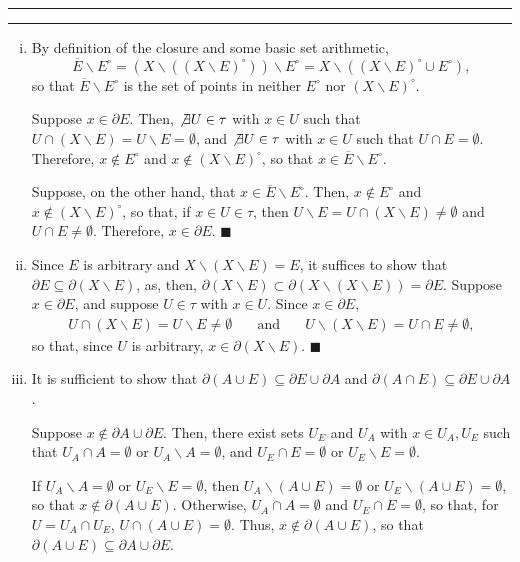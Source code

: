 \documentclass[11pt]{article}
\newcounter{questionCounter}
\newcounter{partCounter}[questionCounter]
\newenvironment{question}[2][\arabic{questionCounter}]{%
    \setcounter{partCounter}{0}%
    \vspace{.25in} \hrule \vspace{0.5em}%
        \noindent{\bf #2}%
    \vspace{0.8em} \hrule \vspace{.10in}%
    \addtocounter{questionCounter}{1}%
}{}
\renewcommand{\qed}{\quad $\blacksquare$}
\newcommand{\sminus}{\backslash}
\begin{document}
\begin{question}{Problem 3}
\begin{enumerate}[(i)]
\item By definition of the closure and some basic set arithmetic,
\[\overline{E}\sminus E^{\circ}
 = (X\sminus((X\sminus E)^{\circ}))\sminus E^{\circ}
 = X\sminus((X\sminus E)^{\circ} \cup E^{\circ}),
\]
so that $\overline{E}\sminus E^{\circ}$ is the set of points in neither
$E^{\circ}$ nor $(X \sminus E)^{\circ}$.

Suppose $x \in \partial E$. Then, $\not\exists U \in \tau$ with $x \in U$
such that $U \cap (X \sminus E) = U \sminus E = \emptyset$, and
$\not \exists U \in \tau$ with $x \in U$ such that $U \cap E = \emptyset$.
Therefore, $x \not \in E^{\circ}$ and $x \not \in (X \sminus E)^{\circ}$, so
that $x \in \overline{E}\sminus E^{\circ}$.

Suppose, on the other hand, that $x \in \overline{E}\sminus E^{\circ}$. Then,
$x \not \in E^{\circ}$ and $x \not \in (X \sminus E)^{\circ}$, so that, if
$x \in U \in \tau$, then $U \sminus E = U \cap (X \sminus E) \neq \emptyset$
and $U \cap E \neq \emptyset$. Therefore, $x \in \partial E$. \qed


\item Since $E$ is arbitrary and $X \sminus (X \sminus E) = E$, it suffices to
show that $\partial E \subseteq \partial(X \sminus E)$, as, then,
$\partial(X \sminus E) \subset \partial(X \sminus (X \sminus E)) = \partial E$.
Suppose $x \in \partial E$, and suppose $U \in \tau$ with $x \in U$. Since
$x \in \partial E$,
\begin{eqnarray*}
U \cap (X \sminus E)    = U \sminus E \neq \emptyset
& \quad \mbox{and} \quad &
U \sminus (X \sminus E) = U \cap E \neq \emptyset,
\end{eqnarray*}
so that, since $U$ is arbitrary, $x \in \partial (X \sminus E)$. \qed

\item It is sufficient to show that
$\partial(A \cup E) \subseteq \partial E \cup \partial A$ and
$\partial(A \cap E) \subseteq \partial E \cup \partial A$.

Suppose $x \not\in \partial A \cup \partial E$. Then, there exist sets $U_E$
and $U_A$ with $x \in U_A,U_E$ such that $U_A \cap A = \emptyset$ or
$U_A \sminus A = \emptyset$, and $U_E \cap E = \emptyset$ or
$U_E \sminus E = \emptyset$.

If $U_A \sminus A = \emptyset$ or $U_E \sminus E = \emptyset$, then
$U_A \sminus (A \cup E) = \emptyset$ or $U_E \sminus (A \cup E) = \emptyset$,
so that $x \not \in \partial (A \cup E)$. Otherwise, $U_A \cap A = \emptyset$
and $U_E \cap E = \emptyset$, so that, for
$U = U_A \cap U_E$, $U \cap (A \cup E) = \emptyset$. Thus,
$x \not\in \partial(A \cup E)$, so that
$\partial (A \cup E) \subseteq \partial A \cup \partial E$.


\end{enumerate}
\end{question}
\end{document}
